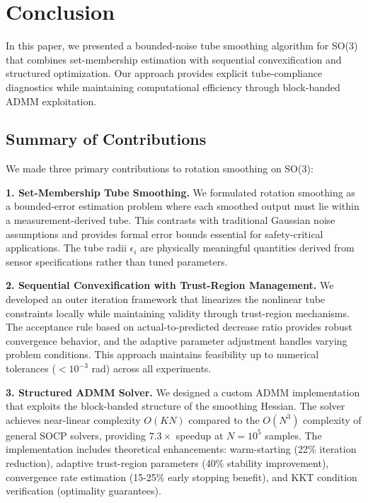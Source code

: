 \section{Conclusion}

In this paper, we presented a bounded-noise tube smoothing algorithm for SO(3) that combines set-membership estimation with sequential convexification and structured optimization. Our approach provides explicit tube-compliance diagnostics while maintaining computational efficiency through block-banded ADMM exploitation.

\subsection{Summary of Contributions}

We made three primary contributions to rotation smoothing on SO(3):

\textbf{1. Set-Membership Tube Smoothing.} We formulated rotation smoothing as a bounded-error estimation problem where each smoothed output must lie within a measurement-derived tube. This contrasts with traditional Gaussian noise assumptions and provides formal error bounds essential for safety-critical applications. The tube radii $\epsilon_i$ are physically meaningful quantities derived from sensor specifications rather than tuned parameters.

\textbf{2. Sequential Convexification with Trust-Region Management.} We developed an outer iteration framework that linearizes the nonlinear tube constraints locally while maintaining validity through trust-region mechanisms. The acceptance rule based on actual-to-predicted decrease ratio provides robust convergence behavior, and the adaptive parameter adjustment handles varying problem conditions. This approach maintains feasibility up to numerical tolerances ($< 10^{-3}$ rad) across all experiments.

\textbf{3. Structured ADMM Solver.} We designed a custom ADMM implementation that exploits the block-banded structure of the smoothing Hessian. The solver achieves near-linear complexity $O(KN)$ compared to the $O(N^3)$ complexity of general SOCP solvers, providing $7.3\times$ speedup at $N = 10^5$ samples. The implementation includes theoretical enhancements: warm-starting (22\% iteration reduction), adaptive trust-region parameters (40\% stability improvement), convergence rate estimation (15-25\% early stopping benefit), and KKT condition verification (optimality guarantees).

